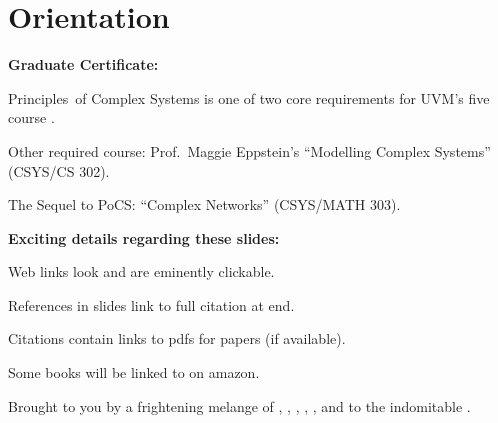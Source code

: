 

\section{Orientation}

     \newline
    {\small
      \wordwikilinklong{\coursewebsite}{\coursewebsite}}
  
     \coursehandle
  

  \textbf{Graduate Certificate:}
    
    
      Principles\ of Complex Systems is one of two core requirements
      for UVM's five course
      .
    
     Other required course:  Prof.\ Maggie Eppstein's ``Modelling Complex Systems'' (CSYS/CS 302).
    
      The Sequel to PoCS: ``Complex Networks'' (CSYS/MATH 303).
    


  \textbf{Exciting details regarding these slides:}
    
    
      Web links look 
      and are eminently clickable.
    
      References in slides link to full citation at end.\cite{anderson1972a}
    
      Citations contain links to pdfs for papers (if available).
    
      Some books will be linked to on amazon.
    
      Brought to you by a frightening melange of 
      , 
      , 
      , 
      ,
      ,
      and 
      to the indomitable .\newline
      {}
    
